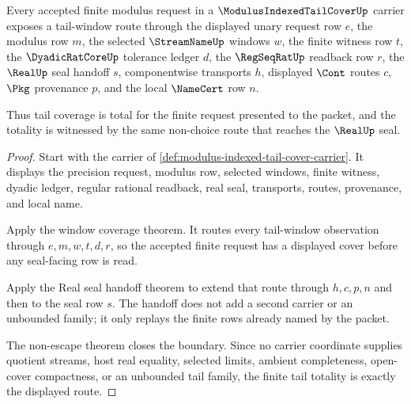 \begin{theorem}
\label{thm:modulus-indexed-tail-cover-tail-totality}
Every accepted finite modulus request in a $\ModulusIndexedTailCoverUp$ carrier exposes a tail-window route through the displayed unary request row $e$, the modulus row $m$, the selected $\StreamNameUp$ windows $w$, the finite witness row $t$, the $\DyadicRatCoreUp$ tolerance ledger $d$, the $\RegSeqRatUp$ readback row $r$, the $\RealUp$ seal handoff $s$, componentwise transports $h$, displayed $\Cont$ routes $c$, $\Pkg$ provenance $p$, and the local $\NameCert$ row $n$.

Thus tail coverage is total for the finite request presented to the packet, and the totality is witnessed by the same non-choice route that reaches the $\RealUp$ seal.
\end{theorem}
\begin{proof}
Start with the carrier of \autoref{def:modulus-indexed-tail-cover-carrier}. It displays the precision request, modulus row, selected windows, finite witness, dyadic ledger, regular rational readback, real seal, transports, routes, provenance, and local name.

Apply the window coverage theorem. It routes every tail-window observation through $e,m,w,t,d,r$, so the accepted finite request has a displayed cover before any seal-facing row is read.

Apply the Real seal handoff theorem to extend that route through $h,c,p,n$ and then to the seal row $s$. The handoff does not add a second carrier or an unbounded family; it only replays the finite rows already named by the packet.

The non-escape theorem closes the boundary. Since no carrier coordinate supplies quotient streams, host real equality, selected limits, ambient completeness, open-cover compactness, or an unbounded tail family, the finite tail totality is exactly the displayed route.
\end{proof}


